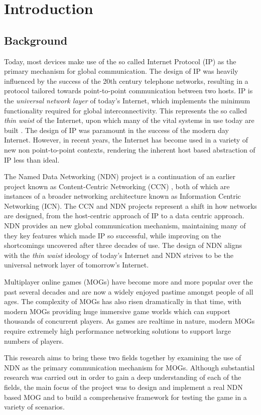 \chapter{Introduction}
\section{Background}
Today, most devices make use of the so called Internet Protocol (IP) as the primary mechanism for global communication. The design of IP was heavily influenced by the success of the 20th century telephone networks, resulting in a protocol tailored towards point-to-point communication between two hosts. IP is the \textit{universal network layer} of today's Internet, which implements the minimum functionality required for global interconnectivity. This represents the so called \textit{thin waist} of the Internet, upon which many of the vital systems in use today are built \cite{ndn-exec-summary}. The design of IP was paramount in the success of the modern day Internet. However, in recent years, the Internet has become used in a variety of new non point-to-point contexts, rendering the inherent host based abstraction of IP less than ideal.  

The Named Data Networking (NDN) project is a continuation of an earlier project known as Content-Centric Networking (CCN) \cite{vj-named-content}, both of which are instances of a broader networking architecture known as Information Centric Networking (ICN). The CCN and NDN projects represent a shift in how networks are designed, from the host-centric approach of IP to a data centric approach. NDN provides an new global communication mechanism, maintaining many of they key features which made IP so successful, while improving on the shortcomings uncovered after three decades of use. The design of NDN aligns with the \textit{thin waist} ideology of today's Internet and NDN strives to be the universal network layer of tomorrow's Internet. 

Multiplayer online games (MOGs) have become more and more popular over the past several decades and are now a widely enjoyed pastime amongst people of all ages. The complexity of MOGs has also risen dramatically in that time, with modern MOGs providing huge immersive game worlds which can support thousands of concurrent players. As games are realtime in nature, modern MOGs require extremely high performance networking solutions to support large numbers of players.


This research aims to bring these two fields together by examining the use of NDN as the primary communication mechanism for MOGs. Although substantial research was carried out in order to gain a deep understanding of each of the fields, the main focus of the project was to design and implement a real NDN based MOG and to build a comprehensive framework for testing the game in a variety of scenarios.    


